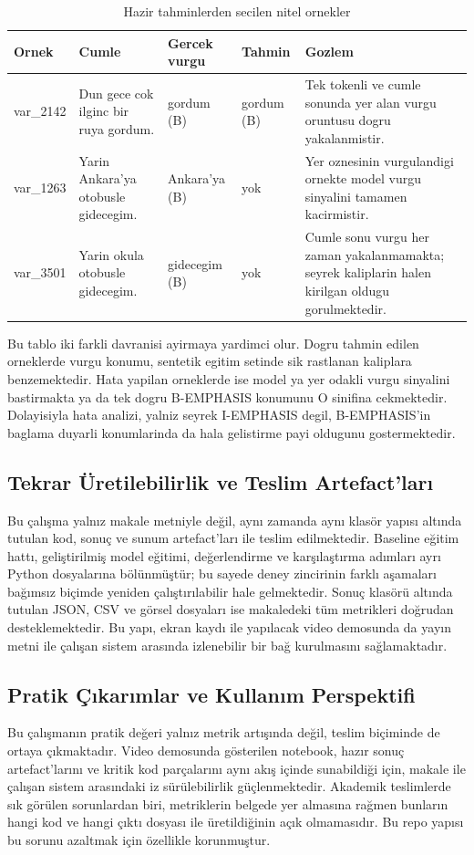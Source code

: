 \documentclass[conference]{IEEEtran}
\begin{document}
\begin{table}[t]
\centering
\caption{Hazir tahminlerden secilen nitel ornekler}
\label{tab:qualitative}
\begin{tabular}{p{2cm}p{6.1cm}p{2.2cm}p{2.2cm}p{4.5cm}}
\toprule
Ornek & Cumle & Gercek vurgu & Tahmin & Gozlem \\
\midrule
var\_2142 & Dun gece cok ilginc bir ruya gordum. & gordum (B) & gordum (B) & Tek tokenli ve cumle sonunda yer alan vurgu oruntusu dogru yakalanmistir. \\
var\_1263 & Yarin Ankara'ya otobusle gidecegim. & Ankara'ya (B) & yok & Yer oznesinin vurgulandigi ornekte model vurgu sinyalini tamamen kacirmistir. \\
var\_3501 & Yarin okula otobusle gidecegim. & gidecegim (B) & yok & Cumle sonu vurgu her zaman yakalanmamakta; seyrek kaliplarin halen kirilgan oldugu gorulmektedir. \\
\bottomrule
\end{tabular}
\end{table}

Bu tablo iki farkli davranisi ayirmaya yardimci olur. Dogru tahmin edilen orneklerde vurgu konumu, sentetik egitim setinde sik rastlanan kaliplara benzemektedir. Hata yapilan orneklerde ise model ya yer odakli vurgu sinyalini bastirmakta ya da tek dogru B-EMPHASIS konumunu O sinifina cekmektedir. Dolayisiyla hata analizi, yalniz seyrek I-EMPHASIS degil, B-EMPHASIS'in baglama duyarli konumlarinda da hala gelistirme payi oldugunu gostermektedir.

\subsection{Tekrar Üretilebilirlik ve Teslim Artefact'ları}
Bu çalışma yalnız makale metniyle değil, aynı zamanda aynı klasör yapısı altında tutulan kod, sonuç ve sunum artefact'ları ile teslim edilmektedir. Baseline eğitim hattı, geliştirilmiş model eğitimi, değerlendirme ve karşılaştırma adımları ayrı Python dosyalarına bölünmüştür; bu sayede deney zincirinin farklı aşamaları bağımsız biçimde yeniden çalıştırılabilir hale gelmektedir. Sonuç klasörü altında tutulan JSON, CSV ve görsel dosyaları ise makaledeki tüm metrikleri doğrudan desteklemektedir. Bu yapı, ekran kaydı ile yapılacak video demosunda da yayın metni ile çalışan sistem arasında izlenebilir bir bağ kurulmasını sağlamaktadır.

\subsection{Pratik Çıkarımlar ve Kullanım Perspektifi}
Bu çalışmanın pratik değeri yalnız metrik artışında değil, teslim biçiminde de ortaya çıkmaktadır. Video demosunda gösterilen notebook, hazır sonuç artefact'larını ve kritik kod parçalarını aynı akış içinde sunabildiği için, makale ile çalışan sistem arasındaki iz sürülebilirlik güçlenmektedir. Akademik teslimlerde sık görülen sorunlardan biri, metriklerin belgede yer almasına rağmen bunların hangi kod ve hangi çıktı dosyası ile üretildiğinin açık olmamasıdır. Bu repo yapısı bu sorunu azaltmak için özellikle korunmuştur.
\end{document}
